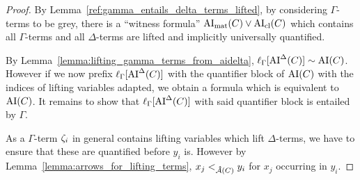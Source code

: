 \documentclass[,%
	paper=a4,%
	DIV12, %
	twoside=false,%
	liststotoc,
	bibtotoc,
	draft=false,%
	numbers=noendperiod
]{scrartcl}
\begin{document}
\begin{proof}
\begin{comment}
				$\Gamma \entails Q_1' z_1' \dots Q_{m'}' z_{m'}' \Big( \AImatrix(C_2) \lor \clauseTwoPrime \lor {\lnot (l{\fromclause'})_\Gamma} \Big)$
				\bigskip


				By the previous proof:

				$\Gamma \stackrel{\markA}\entails Q_1 z_1 \dots Q_m z_m \Big(\lifboth{\AImatrix(C_1)\sigma}\tau \lor \lifboth{\clauseOnePrime\sigma}\tau \lor \lifboth{(l{\fromclause})_\Gamma\sigma}\tau \Big)$

				$\Gamma \stackrel{\markB}\entails Q_1' z_1' \dots Q_{m'}' z_{m'}' \Big(  \lifboth{\AImatrix(C_2)\sigma}\tau \lor \lifboth{\clauseTwoPrime\sigma}\tau \lor \lnot \lifboth{(l{\fromclause'})_\Gamma\sigma}\tau \Big)$

		\end{description}
	\end{comment}

	By Lemma~\ref{ref:gamma_entails_delta_terms_lifted}, by considering $\Gamma$-terms to be grey, there is a ``witness formula'' 
	$\operatorname{AI}_\mathrm{mat}(C) \lor \operatorname{AI}_\mathrm{cl}(C)$ which contains all $\Gamma$-terms and all $\Delta$-terms are lifted and implicitly universally quantified.

	By Lemma~\ref{lemma:lifting_gamma_terms_from_aidelta},
	$\ell_{\Gamma}[\operatorname{AI}^\Delta(C)] \sim \operatorname{AI}(C)$.
	However if we now prefix $\ell_{\Gamma}[\operatorname{AI}^\Delta(C)]$ with the quantifier block of $\operatorname{AI}(C)$ with the indices of lifting variables adapted, we obtain a formula which is equivalent to $\operatorname{AI}(C)$.
	It remains to show that $\ell_{\Gamma}[\operatorname{AI}^\Delta(C)]$ with said quantifier block is entailed by $\Gamma$.

	As a $\Gamma$-term $\zeta_{i}$ in general contains lifting variables which lift $\Delta$-terms, we have to ensure that these are quantified before $y_i$ is.
	However by Lemma~\ref{lemma:arrows_for_lifting_terms}, $x_j <_{\operatorname{{\mathcal{\bm{\hat}A}}}(C)} y_i$ for $x_j$ occurring in $y_i$.



\end{proof}
\end{document}
